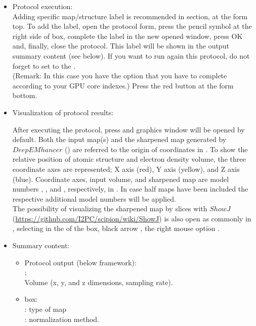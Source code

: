 \begin{itemize}
    \item Protocol execution:\\
  Adding specific map/structure label is recommended in  section, at the form top. To add the label, open the protocol form, press the pencil symbol at the right side of  box, complete the label in the new opened window, press OK and, finally, close the protocol. This label will be shown in the output summary content (see below). If you want to run again this protocol, do not forget to set to  the .\\
  (Remark: In this case you have the option  that you have to complete according to your GPU core indexes.)
  Press the  red button at the form bottom.
  
  \item Visualization of protocol results:
  
  After executing the protocol, press  and \chimera graphics window will be opened by default. Both the input map(s) and the sharpened map generated by $DeepEMhancer$ () are referred to the origin of coordinates in \chimera. To show the relative position of atomic structure and electron density volume, the three coordinate axes are represented; X axis (red), Y axis (yellow), and Z axis (blue). Coordinate axes, input volume, and sharpened map are model numbers ,  , and , respectively, in \chimera {}. In case half maps have been included the respective additional model numbers will be applied.\\
  
  The possibility of visualizing the sharpened map by slices with $ShowJ$ (\url{https://github.com/I2PC/scipion/wiki/ShowJ}) is also open as commonly in \scipion, selecting in the  of the  box, black arrow , the right mouse option . 
  
  \item Summary content:
  \begin{itemize}
     \item Protocol output (below \scipion framework):\\ ;\\ Volume (x, y, and z dimensions, sampling rate).
     \item {} box:\\ : type of map\\ : normalization method.
  \end{itemize}
    
\end{itemize}


